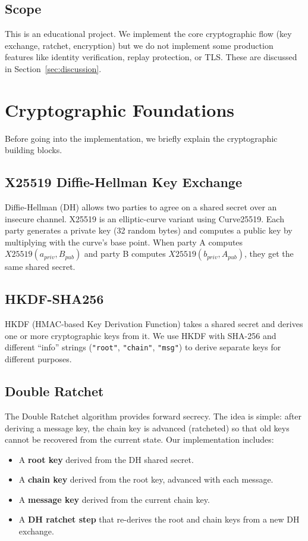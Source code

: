 \documentclass[12pt,a4paper]{article}
\begin{document}
\subsection{Scope}

This is an educational project. We implement the core cryptographic flow (key exchange, ratchet, encryption) but we do not implement some production features like identity verification, replay protection, or TLS. These are discussed in Section~\ref{sec:discussion}.

\section{Cryptographic Foundations}

Before going into the implementation, we briefly explain the cryptographic building blocks.

\subsection{X25519 Diffie-Hellman Key Exchange}

Diffie-Hellman (DH) allows two parties to agree on a shared secret over an insecure channel. X25519 is an elliptic-curve variant using Curve25519. Each party generates a private key (32 random bytes) and computes a public key by multiplying with the curve's base point. When party A computes $X25519(a_{priv}, B_{pub})$ and party B computes $X25519(b_{priv}, A_{pub})$, they get the same shared secret.

\subsection{HKDF-SHA256}

HKDF (HMAC-based Key Derivation Function) takes a shared secret and derives one or more cryptographic keys from it. We use HKDF with SHA-256 and different ``info'' strings (\texttt{"root"}, \texttt{"chain"}, \texttt{"msg"}) to derive separate keys for different purposes.

\subsection{Double Ratchet}

The Double Ratchet algorithm provides forward secrecy. The idea is simple: after deriving a message key, the chain key is advanced (ratcheted) so that old keys cannot be recovered from the current state. Our implementation includes:
\begin{itemize}
    \item A \textbf{root key} derived from the DH shared secret.
    \item A \textbf{chain key} derived from the root key, advanced with each message.
    \item A \textbf{message key} derived from the current chain key.
    \item A \textbf{DH ratchet step} that re-derives the root and chain keys from a new DH exchange.
\end{itemize}
\end{document}
